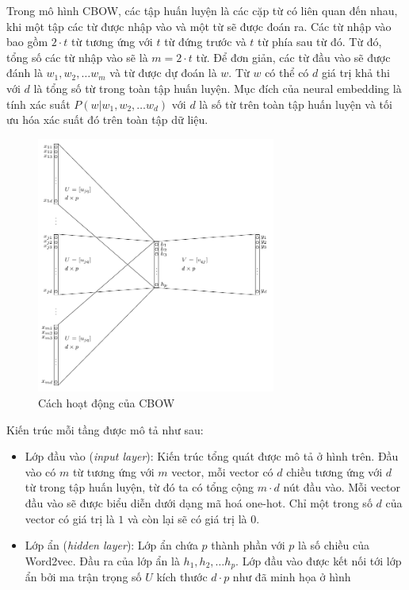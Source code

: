 Trong mô hình CBOW, các tập huấn luyện là các cặp từ có liên quan đến nhau, khi một tập các từ được nhập vào và một từ sẽ được đoán ra. Các từ nhập vào bao gồm $2\cdot t$ từ tương ứng với $t$ từ đứng trước và $t$ từ phía sau từ đó. Từ đó, tổng số các từ nhập vào sẽ là $m = 2\cdot t$ từ. Để đơn giản, các từ đầu vào sẽ được đánh là $w_1, w_2,\dots w_m$  và từ được dự đoán là $w$. Từ $w$ có thể có $d$ giá trị khả thi với $d$ là tổng số từ trong toàn tập huấn luyện. Mục đích của neural embedding là tính xác suất $P(w|w_1,w_2,\dots w_d)$ với $d$ là số từ trên toàn tập huấn luyện và tối ưu hóa xác suất đó trên toàn tập dữ liệu.
\begin{figure}[htbp]
    \centering
    \includegraphics[width=0.7\textwidth]{tikz_image/word2vec_cbow.pdf}
    \caption{Cách hoạt động của CBOW \cite{Aggarwal2022-xj}}
    \label{figure:word2vec-cbow}
\end{figure}

Kiến trúc mỗi tầng được mô tả như sau: \cite{Aggarwal2022-xj}
\begin{itemize}
    \item Lớp đầu vào (\textit{input layer}): Kiến trúc tổng quát được mô tả ở hình trên. Đầu vào có $m$ từ tương ứng với $m$ vector, mỗi vector có $d$ chiều tương ứng với $d$ từ trong tập huấn luyện, từ đó ta có tổng cộng $m\cdot d$ nút đầu vào. Mỗi vector đầu vào sẽ được biểu diễn dưới dạng mã hoá one-hot. Chỉ một trong số $d$ của vector có giá trị là $1$ và còn lại sẽ có giá trị là $0$.
    \item Lớp ẩn (\textit{hidden layer}): Lớp ẩn chứa $p$ thành phần với $p$ là số chiều của Word2vec. Đầu ra của lớp ẩn là  $h_1,h_2,\dots h_p$. Lớp đầu vào được kết nối tới lớp ẩn bởi ma trận trọng số $U$ kích thước $d\cdot p$ như đã minh họa ở hình %
\end{itemize}

